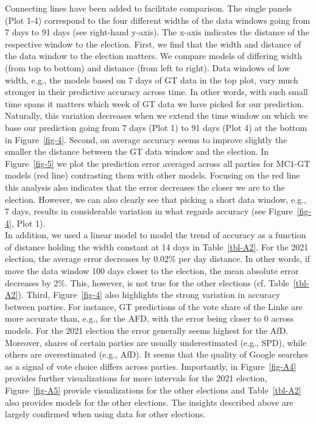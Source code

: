 \documentclass[
  letterpaper,
  DIV=11,
  numbers=noendperiod]{scrartcl}
\begin{document}
Connecting lines have been added to facilitate comparison. The single
panels (Plot 1-4) correspond to the four different widths of the data
windows going from 7 days to 91 days (see right-hand y-axis). The x-axis
indicates the distance of the respective window to the election. First,
we find that the width and distance of the data window to the election
matters. We compare models of differing width (from top to bottom) and
distance (from left to right). Data windows of low width, e.g., the
models based on 7 days of GT data in the top plot, vary much stronger in
their predictive accuracy across time. In other words, with such small
time spans it matters which week of GT data we have picked for our
prediction. Naturally, this variation decreases when we extend the time
window on which we base our prediction going from 7 days (Plot 1) to 91
days (Plot 4) at the bottom in Figure~\ref{fig-4}. Second, on average
accuracy seems to improve slightly the smaller the distance between the
GT data window and the election. In Figure~\ref{fig-5} we plot the
prediction error averaged across all parties for MC1-GT models (red
line) contrasting them with other models. Focusing on the red line this
analysis also indicates that the error decreases the closer we are to
the election. However, we can also clearly see that picking a short data
window, e.g., 7 days, results in considerable variation in what regards
accuracy (see Figure~\ref{fig-4}, Plot 1).\\
In addition, we used a linear model to model the trend of accuracy as a
function of distance holding the width constant at 14 days in
Table~\ref{tbl-A2}. For the 2021 election, the average error decreases
by 0.02\% per day distance. In other words, if move the data window 100
days closer to the election, the mean absolute error decreases by 2\%.
This, however, is not true for the other elections (cf.
Table~\ref{tbl-A2}). Third, Figure~\ref{fig-4} also highlights the
strong variation in accuracy between parties. For instance, GT
predictions of the vote share of the Linke are more accurate than, e.g.,
for the AFD, with the error being closer to 0 across models. For the
2021 election the error generally seems highest for the AfD. Moreover,
shares of certain parties are usually underestimated (e.g., SPD), while
others are overestimated (e.g., AfD). It seems that the quality of
Google searches as a signal of vote choice differs across parties.
Importantly, in Figure~\ref{fig-A4} provides further visualizations for
more intervals for the 2021 election, Figure~\ref{fig-A5} provide
visualizations for the other elections and Table~\ref{tbl-A2} also
provides models for the other elections. The insights described above
are largely confirmed when using data for other elections.
\end{document}

